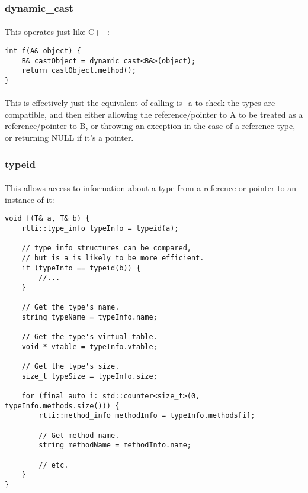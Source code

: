 \documentclass[12pt,twoside,notitlepage]{report}
\begin{document}
\subsubsection{dynamic\_cast}

\paragraph{}
This operates just like C++:

\begin{lstlisting}
int f(A& object) {
	B& castObject = dynamic_cast<B&>(object);
	return castObject.method();
}
\end{lstlisting}

\paragraph{}
This is effectively just the equivalent of calling is\_a to check the types are compatible, and then either allowing the reference/pointer to A to be treated as a reference/pointer to B, or throwing an exception in the case of a reference type, or returning NULL if it's a pointer.

\subsubsection{typeid}

\paragraph{}
This allows access to information about a type from a reference or pointer to an instance of it:

\begin{lstlisting}
void f(T& a, T& b) {
	rtti::type_info typeInfo = typeid(a);
	
	// type_info structures can be compared,
	// but is_a is likely to be more efficient.
	if (typeInfo == typeid(b)) {
		//...
	}
	
	// Get the type's name.
	string typeName = typeInfo.name;
	
	// Get the type's virtual table.
	void * vtable = typeInfo.vtable;
	
	// Get the type's size.
	size_t typeSize = typeInfo.size;
	
	for (final auto i: std::counter<size_t>(0, typeInfo.methods.size())) {
		rtti::method_info methodInfo = typeInfo.methods[i];
		
		// Get method name.
		string methodName = methodInfo.name;
		
		// etc.
	}
}
\end{lstlisting}
\end{document}

